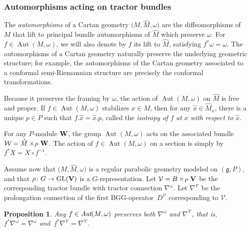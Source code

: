 \documentclass[10pt,a4paper]{amsart}
\numberwithin{equation}{section}
\newtheorem{prop}[thm]{Proposition}
\theoremstyle{definition}
\def\V{{\bf V}}
\newcommand{\cV}{{\mathcal V}}
\newcommand{\cS}{{\mathcal S}}
\def\g{{\mathfrak g}}
\newcommand{\Aut}{\operatorname{Aut}}
\begin{document}
\subsubsection{Automorphisms acting on tractor bundles}
\label{sec.aut.tractor}

The \emph{automorphisms} of a Cartan geometry $\bigl(M,\hat{M},\omega\bigr)$ are the diffeomorphisms of $M$ that lift to principal bundle automorphisms of $\hat{M}$ which preserve $\omega$. For $f \in \operatorname{Aut}(M,\omega)$, we will also denote by $f$ its lift to $\hat{M}$, satisfying $f^* \omega = \omega$.
The automorphisms of a Cartan geometry naturally preserve the underlying geometric structure; for example, the automorphisms of the Cartan geometry associated to a conformal semi-Riemannian structure are precisely the conformal transformations.

Because it preserves the framing by $\omega$, the action of $\Aut(M,\omega)$ on $\hat{M}$ is free and proper. If $f \in \Aut(M,\omega)$ stabilizes $x \in M$, then for any $\hat{x} \in \hat{M}_x$, there is a unique $p \in P$ such that {$f.\hat{x} = \hat{x}.p$}, called the \emph{isotropy of $f$ at $x$ with respect to $\hat{x}$}.

For any $P$-module ${\bf W}$, the group $\Aut(M,\omega)$ acts on the associated bundle $\mathcal{W} = \hat{M} \times_P {\bf W}$.
The action of $f \in \Aut(M,\omega)$ on a section \smash{$X \in \Gamma(\cS)\cong C^{\infty}\bigl(\hat{M}, {\bf W}\bigr)^P$} is simply by
$f^*X = X \circ f^{-1}$.

Assume now that $\bigl(M,\hat{M},\omega\bigr)$ is a regular parabolic geometry modeled on $(\g, P)$, and that $\rho\colon G\rightarrow \textrm{GL}(\V)$ is a $G$-representation.
Let $\cV=B\times_P\V$ be the corresponding tractor bundle with tractor connection $\nabla^{\omega}$. Let $\nabla^{\cV}$ be the prolongation connection of the
first BGG-operator~$D^{\cV}$ corresponding to $\cV$.
\begin{prop} Any $f \in\emph{Aut}(M, \omega)$ preserves both $\nabla^\omega$ and $\nabla^{\cV}$, that is, $f^* \nabla^\omega = \nabla^\omega$ and~${f^*\nabla^{\cV}=\nabla^{\cV}}$.
\end{prop}
\end{document}
